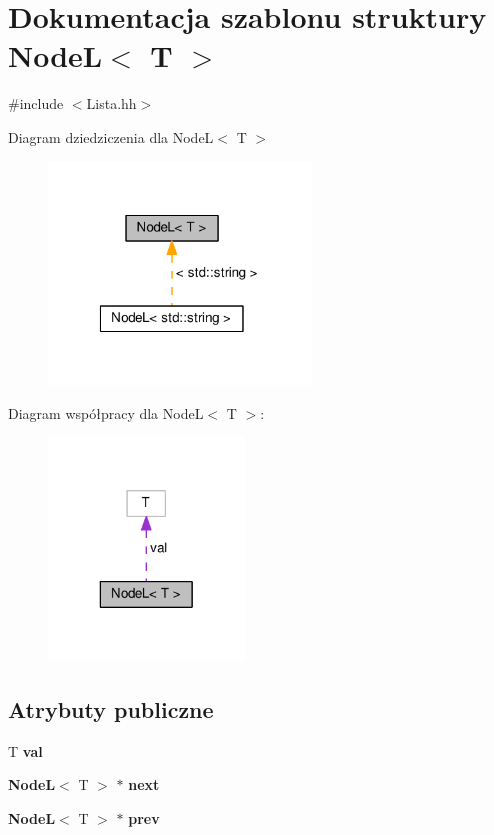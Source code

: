 \section{Dokumentacja szablonu struktury Node\-L$<$ T $>$}
\label{struct_node_l}


{\ttfamily \#include $<$Lista.\-hh$>$}



Diagram dziedziczenia dla Node\-L$<$ T $>$
\nopagebreak
\begin{figure}[H]
\begin{center}
\leavevmode
\includegraphics[width=198pt]{struct_node_l__inherit__graph}
\end{center}
\end{figure}


Diagram współpracy dla Node\-L$<$ T $>$\-:
\nopagebreak
\begin{figure}[H]
\begin{center}
\leavevmode
\includegraphics[width=148pt]{struct_node_l__coll__graph}
\end{center}
\end{figure}
\subsection*{Atrybuty publiczne}
\begin{DoxyCompactItemize}
\item 
T {\bf val}
\item 
{\bf Node\-L}$<$ T $>$ $\ast$ {\bf next}
\item 
{\bf Node\-L}$<$ T $>$ $\ast$ {\bf prev}
\end{DoxyCompactItemize}


